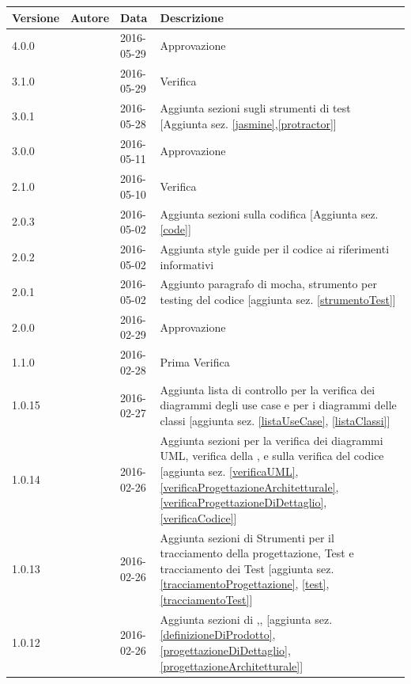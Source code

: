 \documentclass[12pt,a4paper]{article}
\begin{document}
\begin{center}
	\begin{longtable}[H]{p{} p{} p{} p{}}
		\toprule
		\textbf{Versione}	&	\textbf{Autore}	&	\textbf{Data}	&	\textbf{Descrizione}\\*
		\midrule
		\midrule
		4.0.0 & \AVI{} & 2016-05-29 & Approvazione\\*
		\midrule
		3.1.0 & \TP{} & 2016-05-29 & Verifica\\*
		\midrule
		3.0.1 & \AVE{} & 2016-05-28 & Aggiunta sezioni sugli strumenti di test [Aggiunta sez. \ref{jasmine},\ref{protractor}]\\*
		\midrule
		3.0.0 & \AVE{} & 2016-05-11 & Approvazione\\*
		\midrule
		2.1.0 & \WS{} & 2016-05-10 & Verifica\\*
		\midrule
		2.0.3 & \IB{} & 2016-05-02 & Aggiunta sezioni sulla codifica [Aggiunta sez. \ref{code}]\\*
		\midrule
		2.0.2 & \IB{} & 2016-05-02 & Aggiunta style guide per il codice ai riferimenti informativi\\*
		\midrule
		2.0.1 & \IB{} & 2016-05-02 & Aggiunto paragrafo di mocha, strumento per testing del codice [aggiunta sez. \ref{strumentoTest}]\\*
		\midrule
		2.0.0 & \AB{} & 2016-02-29 & Approvazione\\*
		\midrule
		1.1.0 & \AVI{} & 2016-02-28 & Prima Verifica\\*
		\midrule
		1.0.15 & \TP{} & 2016-02-27 & Aggiunta lista di controllo per la verifica dei diagrammi degli use case e per i diagrammi delle classi [aggiunta sez. 
		\ref{listaUseCase},
		\ref{listaClassi}]\\*
		\midrule
		1.0.14 & \TP{} & 2016-02-26 & Aggiunta sezioni per la verifica dei diagrammi UML, verifica della \FPA{}, \FPD{} e sulla verifica del codice [aggiunta sez. 
		\ref{verificaUML},
		\ref{verificaProgettazioneArchitetturale},
		\ref{verificaProgettazioneDiDettaglio},
		\ref{verificaCodice}]\\*
		\midrule
		1.0.13 & \TP{} & 2016-02-26 & Aggiunta sezioni di Strumenti per il tracciamento della progettazione, Test e tracciamento dei Test [aggiunta sez. 
		\ref{tracciamentoProgettazione},
		\ref{test},
		\ref{tracciamentoTest}]\\*
		\midrule
		1.0.12 & \TP{} & 2016-02-26 & Aggiunta sezioni di \DP{},\FPD{},\FPA{} [aggiunta sez. \ref{definizioneDiProdotto},
		\ref{progettazioneDiDettaglio},
		\ref{progettazioneArchitetturale}]\\*

\end{longtable}
\end{center}
\end{document}
